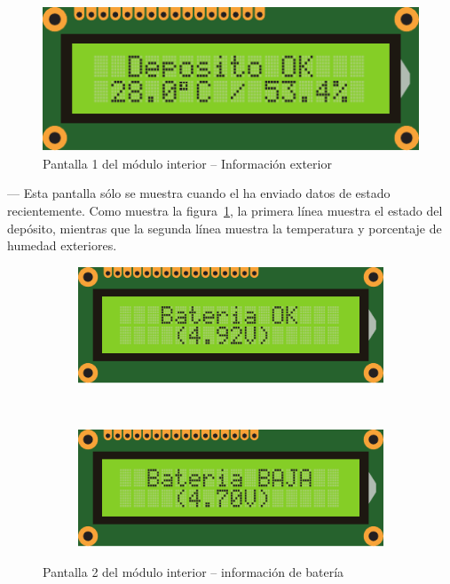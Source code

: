 \begin{descriptioncompact}

\begin{figure}[!b]
  \centering
  \includegraphics[width=0.6\columnwidth]{images/screen1}
  \caption{Pantalla 1 del módulo interior -- Información exterior}
  \label{fig:screen1}
\end{figure}

\item[Pantalla 1: Información exterior] --- Esta pantalla sólo se muestra cuando el \MEE ha enviado datos de estado recientemente. Como muestra la figura~\ref{fig:screen1}, la primera línea muestra el estado del depósito, mientras que la segunda línea muestra la temperatura y porcentaje de humedad exteriores.

\begin{figure}[t]
\centering
\begin{subfigure}{0.6\columnwidth}
  \includegraphics[width=1\columnwidth]{images/screen2a}
  \caption{}
  \label{fig:screen2a}
\end{subfigure}
\\[1em]
\begin{subfigure}{0.6\columnwidth}
  \includegraphics[width=1\columnwidth]{images/screen2b}
  \caption{}
  \label{fig:screen2b}
\end{subfigure}
\caption{Pantalla 2 del módulo interior -- información de batería}
\label{fig:screen2}
\end{figure}


\end{descriptioncompact}
